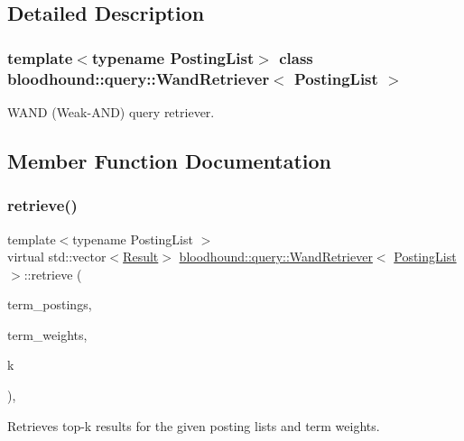 \subsection{Detailed Description}
\subsubsection*{template$<$typename Posting\+List$>$\newline
class bloodhound\+::query\+::\+Wand\+Retriever$<$ Posting\+List $>$}

W\+A\+ND (Weak-\/\+A\+ND) query retriever. 

\subsection{Member Function Documentation}
\mbox{\label{classbloodhound_1_1query_1_1WandRetriever_a5f3068bc363c16c5b7255a925ea5af8c}} 
\subsubsection{\texorpdfstring{retrieve()}{retrieve()}}
{\footnotesize\ttfamily template$<$typename Posting\+List $>$ \\
virtual std\+::vector$<$\mbox{\hyperlink{structbloodhound_1_1query_1_1Result}{Result}}$>$ \mbox{\hyperlink{classbloodhound_1_1query_1_1WandRetriever}{bloodhound\+::query\+::\+Wand\+Retriever}}$<$ \mbox{\hyperlink{classbloodhound_1_1PostingList}{Posting\+List}} $>$\+::retrieve (\begin{DoxyParamCaption}\item[{const std\+::vector$<$ \mbox{\hyperlink{classbloodhound_1_1PostingList}{Posting\+List}} $>$ \&}]{term\+\_\+postings,  }\item[{const std\+::vector$<$ \mbox{\hyperlink{structbloodhound_1_1Score}{Score}} $>$ \&}]{term\+\_\+weights,  }\item[{std\+::size\+\_\+t}]{k }\end{DoxyParamCaption})\hspace{0.3cm}{\ttfamily [inline]}, {\ttfamily [virtual]}}



Retrieves top-\/k results for the given posting lists and term weights. 



